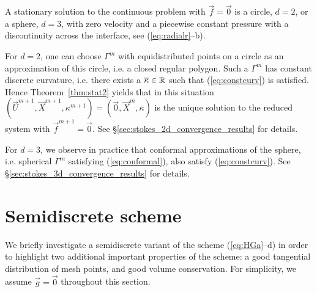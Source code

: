 A stationary solution to the continuous problem with $\vec f = \vec 0$ is a
circle, $d=2$, or a sphere, $d=3$, with zero velocity and a piecewise constant
pressure with a discontinuity across the interface, see (\ref{eq:radialr}--b).

For $d=2$, one can choose $\Gamma^m$ with equidistributed points on a circle as
an approximation of this circle, i.e. a closed regular polygon.
Such a $\Gamma^m$ has constant discrete curvature, i.e. there exists a
$\overline{\kappa} \in \mathbb R$ such that (\ref{eq:constcurv}) is satisfied.
Hence Theorem~\ref{thm:stat2} yields that in this situation $(\vec
U^{m+1}, \vec X^{m+1}, \kappa^{m+1}) = (\vec 0, \vec X^m,\overline{\kappa})$ is
the unique solution to the reduced system with $\vec f^{m+1} =\vec 0$. See
\S\ref{sec:stokes_2d_convergence_results} for details.

For $d=3$, we observe in practice that conformal approximations of the sphere,
i.e. spherical $\Gamma^m$ satisfying (\ref{eq:conformal}), also satisfy
(\ref{eq:constcurv}). See \S\ref{sec:stokes_3d_convergence_results} for details.

\section{Semidiscrete scheme}\label{sec:stokes_semi_fem}
We briefly investigate a semidiscrete variant of the scheme (\ref{eq:HGa}--d)
in order to highlight two additional important properties of the scheme: a
good tangential distribution of mesh points, and good volume conservation. For
simplicity, we assume $\vec g=\vec 0$ throughout this section.


